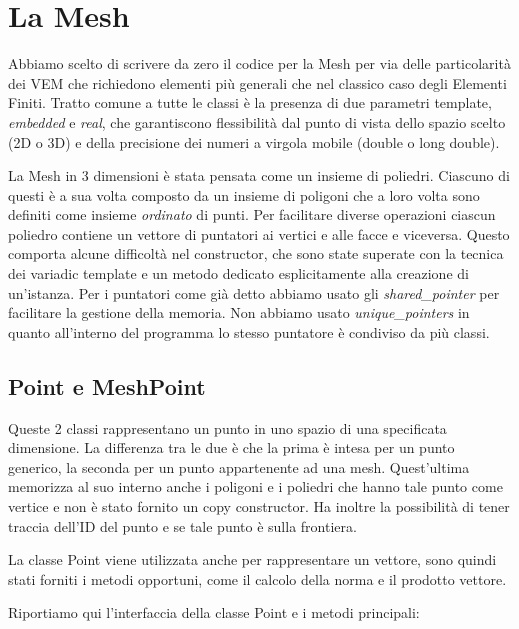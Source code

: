 \documentclass[oneside,12pt]{book}  %
\theoremstyle{plain}
\theoremstyle{definition}
\theoremstyle{remark}
\numberwithin{equation}{chapter} %
\begin{document}
\section{La Mesh}
\label{sec:mesh}
Abbiamo scelto di scrivere da zero il codice per la Mesh per via delle
particolarit\`a dei VEM che richiedono elementi pi\`u generali che nel
classico caso degli Elementi Finiti. Tratto comune a tutte le classi
\`e la presenza di due parametri template, \textit{embedded} e
\textit{real}, che garantiscono flessibilit\`a dal punto di vista
dello spazio scelto (2D o 3D) e della precisione dei numeri a virgola
mobile (double o long double). 

La Mesh in 3 dimensioni \`e stata pensata come un insieme di
poliedri. Ciascuno di questi \`e a sua volta composto da un insieme di
poligoni che a loro volta sono definiti come insieme \textit{ordinato}
di punti. Per facilitare diverse operazioni ciascun poliedro contiene
un vettore di puntatori ai vertici e alle facce e viceversa. Questo
comporta alcune difficolt\`a nel constructor, che sono state superate
con la tecnica dei variadic template e un metodo dedicato
esplicitamente alla creazione di un'istanza. Per i puntatori come
gi\`a detto abbiamo usato gli \textit{shared\_pointer} per facilitare
la gestione della memoria. Non abbiamo usato \textit{unique\_pointers}
in quanto all'interno del programma lo stesso puntatore \`e condiviso
da pi\`u classi.

\subsection{Point e MeshPoint}
Queste 2 classi rappresentano un punto in uno spazio di una
specificata dimensione. La differenza tra le due \`e che la prima \`e
intesa per un punto generico, la seconda per un punto appartenente ad
una mesh. Quest'ultima memorizza al suo interno anche i poligoni e i
poliedri che hanno tale punto come vertice e non \`e stato fornito un
copy constructor. Ha inoltre la possibilit\`a di tener traccia dell'ID
del punto e se tale punto \`e sulla frontiera.

La classe Point viene utilizzata anche per rappresentare un vettore,
sono quindi stati forniti i metodi opportuni, come il calcolo della
norma e il prodotto vettore.

Riportiamo qui l'interfaccia della classe Point e i metodi principali:
\end{document}
